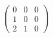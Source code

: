 \documentclass[preview]{standalone}
\begin{document}
\begin{align*}
\begin{pmatrix} 0 & 0 & 0 \\ 1 & 0 & 0 \\ 2 & 1 & 0 \end{pmatrix}
\end{align*}
\end{document}
